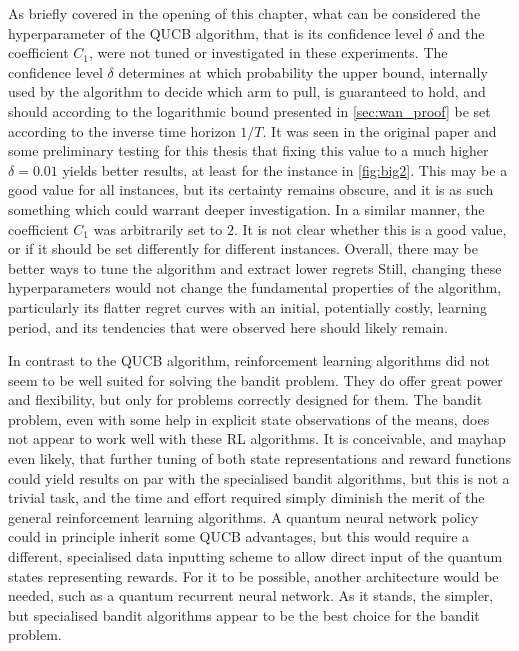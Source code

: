 As briefly covered in the opening of this chapter, what can be considered the hyperparameter of the QUCB algorithm, that is its confidence level $\delta$ and the coefficient $C_1$, were not tuned or investigated in these experiments.
The confidence level $\delta$ determines at which probability the upper bound, internally used by the algorithm to decide which arm to pull, is guaranteed to hold, and should according to the logarithmic bound presented in \cref{sec:wan_proof} be set according to the inverse time horizon $1/T$.
It was seen in the original paper and some preliminary testing for this thesis that fixing this value to a much higher $\delta = 0.01$ yields better results, at least for the instance in \cref{fig:big2}.
This may be a good value for all instances, but its certainty remains obscure, and it is as such something which could warrant deeper investigation.
In a similar manner, the coefficient $C_1$ was arbitrarily set to $2$.
It is not clear whether this is a good value, or if it should be set differently for different instances.
Overall, there may be better ways to tune the algorithm and extract lower regrets
Still, changing these hyperparameters would not change the fundamental properties of the algorithm, particularly its flatter regret curves with an initial, potentially costly, learning period, and its tendencies that were observed here should likely remain.

In contrast to the QUCB algorithm, reinforcement learning algorithms did not seem to be well suited for solving the bandit problem.
They do offer great power and flexibility, but only for problems correctly designed for them.
The bandit problem, even with some help in explicit state observations of the means, does not appear to work well with these RL algorithms.
It is conceivable, and mayhap even likely, that further tuning of both state representations and reward functions could yield results on par with the specialised bandit algorithms, but this is not a trivial task, and the time and effort required simply diminish the merit of the general reinforcement learning algorithms.
A quantum neural network policy could in principle inherit some QUCB advantages, but this would require a different, specialised data inputting scheme to allow direct input of the quantum states representing rewards.
For it to be possible, another architecture would be needed, such as a quantum recurrent neural network.
As it stands, the simpler, but specialised bandit algorithms appear to be the best choice for the bandit problem.